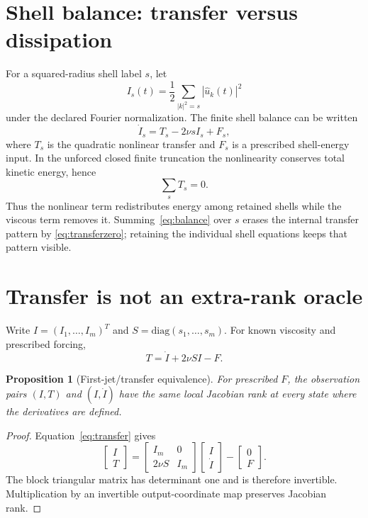 \documentclass[11pt]{article}
\newtheorem{proposition}[theorem]{Proposition}
\theoremstyle{definition}
\begin{document}
\section{Shell balance: transfer versus dissipation}

For a squared-radius shell label $s$, let
\[
I_s(t)=\frac12\sum_{|k|^2=s}|\widehat u_k(t)|^2
\]
under the declared Fourier normalization.  The finite shell balance can be written
\begin{equation}\label{eq:balance}
\boxed{\dot I_s=T_s-2\nu s I_s+F_s,}
\end{equation}
where $T_s$ is the quadratic nonlinear transfer and $F_s$ is a prescribed shell-energy input.  In
the unforced closed finite truncation the nonlinearity conserves total kinetic energy, hence
\begin{equation}\label{eq:transferzero}
\boxed{\sum_sT_s=0.}
\end{equation}
Thus the nonlinear term redistributes energy among retained shells while the viscous term removes
it.  Summing~\eqref{eq:balance} over $s$ erases the internal transfer pattern by
\eqref{eq:transferzero}; retaining the individual shell equations keeps that pattern visible.

\section{Transfer is not an extra-rank oracle}

Write $I=(I_1,\ldots,I_m)^T$ and $S=\mathrm{diag}(s_1,\ldots,s_m)$.  For known viscosity and
prescribed forcing,
\begin{equation}\label{eq:transfer}
T=\dot I+2\nu S I-F.
\end{equation}

\begin{proposition}[First-jet/transfer equivalence]\label{prop:equiv}
For prescribed $F$, the observation pairs $(I,T)$ and $(I,\dot I)$ have the same local Jacobian
rank at every state where the derivatives are defined.
\end{proposition}

\begin{proof}
Equation~\eqref{eq:transfer} gives
\[
\begin{bmatrix}I\\T\end{bmatrix}
=
\begin{bmatrix}I_m&0\\2\nu S&I_m\end{bmatrix}
\begin{bmatrix}I\\\dot I\end{bmatrix}
-
\begin{bmatrix}0\\F\end{bmatrix}.
\]
The block triangular matrix has determinant one and is therefore invertible.  Multiplication by an
invertible output-coordinate map preserves Jacobian rank.
\end{proof}
\end{document}
